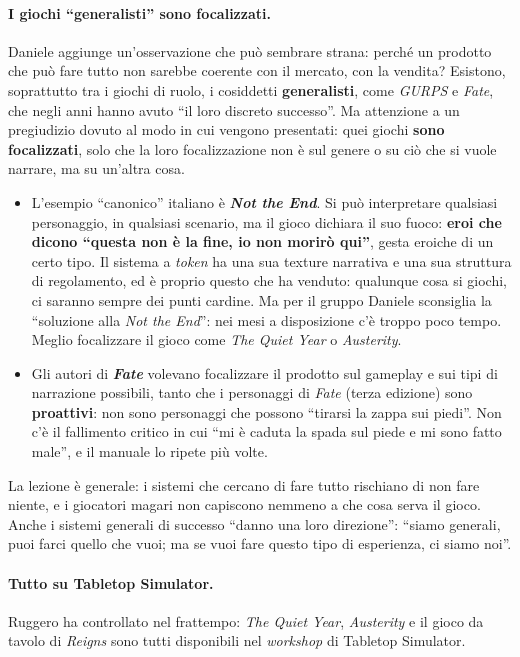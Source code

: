 \paragraph{I giochi ``generalisti'' sono focalizzati.} Daniele aggiunge un'osservazione
che può sembrare strana: perché un prodotto che può fare tutto non sarebbe coerente con
il mercato, con la vendita? Esistono, soprattutto tra i giochi di ruolo, i cosiddetti
\textbf{generalisti}, come \emph{GURPS} e \emph{Fate}, che negli anni hanno avuto ``il
loro discreto successo''. Ma attenzione a un pregiudizio dovuto al modo in cui vengono
presentati: quei giochi \textbf{sono focalizzati}, solo che la loro focalizzazione non è
sul genere o su ciò che si vuole narrare, ma su un'altra cosa.
\begin{itemize}
  \item L'esempio ``canonico'' italiano è \textbf{\emph{Not the End}}. Si può
        interpretare qualsiasi personaggio, in qualsiasi scenario, ma il gioco dichiara
        il suo fuoco: \textbf{eroi che dicono ``questa non è la fine, io non morirò
        qui''}, gesta eroiche di un certo tipo. Il sistema a \emph{token} ha una sua
        texture narrativa e una sua struttura di regolamento, ed è proprio questo che ha
        venduto: qualunque cosa si giochi, ci saranno sempre dei punti cardine.
        Ma per il gruppo Daniele sconsiglia la ``soluzione alla \emph{Not the End}'':
        nei mesi a disposizione c'è troppo poco tempo. Meglio focalizzare il gioco come
        \emph{The Quiet Year} o \emph{Austerity}.
  \item Gli autori di \textbf{\emph{Fate}} volevano focalizzare il prodotto sul gameplay
        e sui tipi di narrazione possibili, tanto che i personaggi di \emph{Fate}
        (terza edizione) sono \textbf{proattivi}: non sono personaggi che possono
        ``tirarsi la zappa sui piedi''. Non c'è il fallimento critico in cui ``mi è caduta
        la spada sul piede e mi sono fatto male'', e il manuale lo ripete più volte.
\end{itemize}
La lezione è generale: i sistemi che cercano di fare tutto rischiano di non fare niente,
e i giocatori magari non capiscono nemmeno a che cosa serva il gioco. Anche i sistemi
generali di successo ``danno una loro direzione'': ``siamo generali, puoi farci quello
che vuoi; ma se vuoi fare questo tipo di esperienza, ci siamo noi''.

\paragraph{Tutto su Tabletop Simulator.} Ruggero ha controllato nel frattempo: \emph{The
Quiet Year}, \emph{Austerity} e il gioco da tavolo di \emph{Reigns} sono tutti
disponibili nel \emph{workshop} di Tabletop Simulator.

